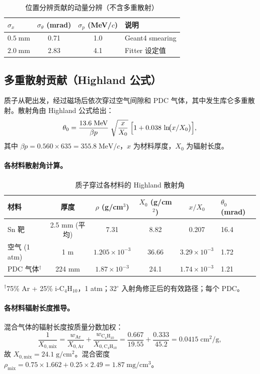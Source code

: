 \documentclass[a4paper, 11pt]{article}
\begin{document}
\begin{table}[H]
\centering
\caption{位置分辨贡献的动量分辨（不含多重散射）}
\begin{tabular}{lccl}
\toprule
$\sigma_x$ & $\sigma_\theta$ (mrad) & $\sigma_p$ (MeV/$c$) & 说明 \\
\midrule
$0.5\;\mathrm{mm}$ & 0.71 & 1.0 & Geant4 smearing \\
$2.0\;\mathrm{mm}$ & 2.83 & 4.1 & Fitter 设定值 \\
\bottomrule
\end{tabular}
\end{table}

\subsection{多重散射贡献（Highland 公式）}

质子从靶出发，经过磁场后依次穿过空气间隙和 PDC 气体，其中发生库仑多重散射。散射角由 Highland 公式给出：
\begin{equation}
  \theta_0 = \frac{13.6\;\mathrm{MeV}}{\beta p}\;
  \sqrt{\frac{x}{X_0}}\;
  \Bigl[1 + 0.038\,\ln\!\bigl(x/X_0\bigr)\Bigr],
  \label{eq:highland}
\end{equation}
其中 $\beta p = 0.560 \times 635 = 355.8\;\mathrm{MeV}/c$，$x$ 为材料厚度，$X_0$ 为辐射长度。

\paragraph{各材料散射角计算。}

\begin{table}[H]
\centering
\caption{质子穿过各材料的 Highland 散射角}
\label{tab:highland}
\begin{tabular}{lccccl}
\toprule
材料 & 厚度 & $\rho$ (g/cm$^3$) & $X_0$ (g/cm$^2$) & $x/X_0$ & $\theta_0$ (mrad) \\
\midrule
Sn 靶 & 2.5 mm (平均) & 7.31 & 8.82 & 0.207 & 16.4 \\
空气 (1 atm) & 1 m & $1.205 \times 10^{-3}$ & 36.66 & $3.29 \times 10^{-3}$ & 1.72 \\
PDC 气体$^\dagger$ & 224 mm & $1.87 \times 10^{-3}$ & 24.1 & $1.74 \times 10^{-3}$ & 1.21 \\
\bottomrule
\end{tabular}
\end{table}
{\footnotesize $^\dagger$75\% Ar + 25\% i-C$_4$H$_{10}$，1 atm；32$^\circ$ 入射角修正后的有效路径；每个 PDC。}

\paragraph{各材料辐射长度推导。}
混合气体的辐射长度按质量分数加权：
\begin{equation}
  \frac{1}{X_{0,\mathrm{mix}}} = \frac{w_\mathrm{Ar}}{X_{0,\mathrm{Ar}}} + \frac{w_{\mathrm{C_4H_{10}}}}{X_{0,\mathrm{C_4H_{10}}}}
  = \frac{0.667}{19.55} + \frac{0.333}{45.2}
  = 0.0415\;\mathrm{cm^2/g},
\end{equation}
故 $X_{0,\mathrm{mix}} = 24.1\;\mathrm{g/cm^2}$。混合密度 $\rho_\mathrm{mix} = 0.75 \times 1.662 + 0.25 \times 2.49 = 1.87\;\mathrm{mg/cm^3}$。
\end{document}
